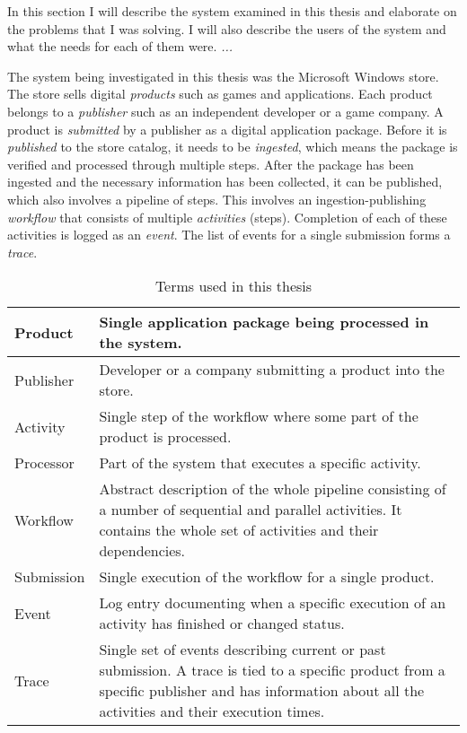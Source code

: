 \documentclass[english,12pt,a4paper,pdftex,sci,utf8]{aaltothesis}
\newcommand{\nyi}[1]{\colorbox{nyibg}{\textcolor{nyitext}{\emph{#1}}}}
\begin{document}
In this section I will describe the system examined in this thesis and elaborate on the 
problems that I was solving. I will also describe the users of the system and what the needs for
each of them were. \nyi{...}

The system being investigated in this thesis was the Microsoft Windows store.
The store sells digital \emph{products} such as games and applications.
Each product belongs to a \emph{publisher} such as an independent developer or a game company.
A product is \emph{submitted} by a publisher as a digital application package.
Before it is \emph{published} to the store catalog, it needs to be \emph{ingested},
which means the package is verified and processed through multiple steps.
After the package has been ingested and the necessary information has been collected,
it can be published, which also involves a pipeline of steps.
This involves an ingestion-publishing \emph{workflow} that consists of multiple \emph{activities} (steps).
Completion of each of these activities is logged as an \emph{event}.
The list of events for a single submission forms a \emph{trace}.

\begin{table}[htb]
\begin{center}
\begin{tabularx}{\linewidth}{| l | X |} \hline
Product   & Single application package being processed in the system. \\ \hline
Publisher & Developer or a company submitting a product into the store. \\ \hline
Activity  & Single step of the workflow where some part of the product is processed. \\ \hline
Processor & Part of the system that executes a specific activity. \\ \hline
Workflow  & Abstract description of the whole pipeline consisting of a number of sequential and parallel activities. It contains the whole set of activities and their dependencies. \\ \hline
Submission & Single execution of the workflow for a single product.\\ \hline
Event     & Log entry documenting when a specific execution of an activity has finished or changed status. \\ \hline
Trace     & Single set of events describing current or past submission. 
            A trace is tied to a specific product from a specific publisher and has information about all 
            the activities and their execution times. \\ \hline
\end{tabularx}
\end{center}
\caption{Terms used in this thesis}
\label{tab:termdefinitions}
\end{table}
\end{document}

